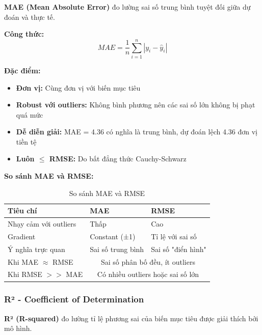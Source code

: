 \documentclass[12pt,a4paper]{article}
\begin{document}
\begin{definitionbox}
\textbf{MAE (Mean Absolute Error)} đo lường sai số trung bình tuyệt đối giữa dự đoán và thực tế.
\end{definitionbox}

\textbf{Công thức:}
\begin{equation}
MAE = \frac{1}{n}\sum_{i=1}^{n}|y_i - \hat{y}_i|
\end{equation}

\textbf{Đặc điểm:}
\begin{itemize}
    \item \textbf{Đơn vị:} Cùng đơn vị với biến mục tiêu
    \item \textbf{Robust với outliers:} Không bình phương nên các sai số lớn không bị phạt quá mức
    \item \textbf{Dễ diễn giải:} MAE = 4.36 có nghĩa là trung bình, dự đoán lệch 4.36 đơn vị tiền tệ
    \item \textbf{Luôn $\leq$ RMSE:} Do bất đẳng thức Cauchy-Schwarz
\end{itemize}

\textbf{So sánh MAE và RMSE:}
\begin{table}[H]
\centering
\caption{So sánh MAE và RMSE}
\begin{tabular}{|l|p{6cm}|p{6cm}|}
\hline
\textbf{Tiêu chí} & \textbf{MAE} & \textbf{RMSE} \\
\hline
Nhạy cảm với outliers & Thấp & Cao \\
\hline
Gradient & Constant (±1) & Tỉ lệ với sai số \\
\hline
Ý nghĩa trực quan & Sai số trung bình & Sai số "điển hình" \\
\hline
Khi MAE $\approx$ RMSE & \multicolumn{2}{c|}{Sai số phân bố đều, ít outliers} \\
\hline
Khi RMSE $>>$ MAE & \multicolumn{2}{c|}{Có nhiều outliers hoặc sai số lớn} \\
\hline
\end{tabular}
\end{table}

\subsubsection{R² - Coefficient of Determination}

\begin{definitionbox}
\textbf{R² (R-squared)} đo lường tỉ lệ phương sai của biến mục tiêu được giải thích bởi mô hình.
\end{definitionbox}
\end{document}
